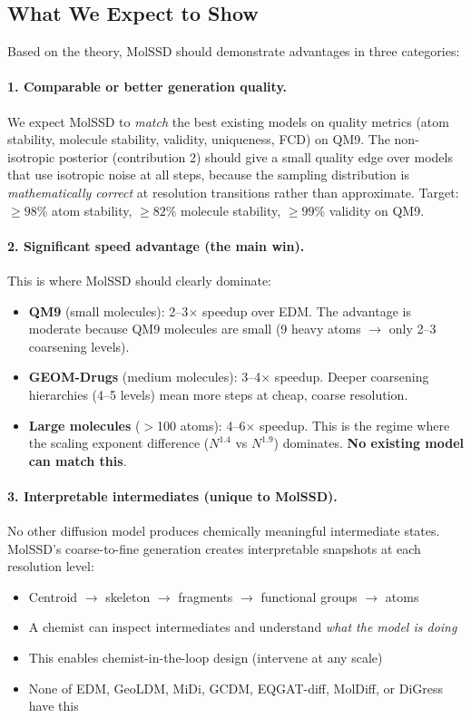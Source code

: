 \documentclass[12pt,a4paper]{article}
\begin{document}
\subsection{What We Expect to Show}

Based on the theory, MolSSD should demonstrate advantages in three categories:

\paragraph{1. Comparable or better generation quality.}
We expect MolSSD to \emph{match} the best existing models on quality metrics (atom stability, molecule stability, validity, uniqueness, FCD) on QM9. The non-isotropic posterior (contribution 2) should give a small quality edge over models that use isotropic noise at all steps, because the sampling distribution is \emph{mathematically correct} at resolution transitions rather than approximate. Target: $\geq 98\%$ atom stability, $\geq 82\%$ molecule stability, $\geq 99\%$ validity on QM9.

\paragraph{2. Significant speed advantage (the main win).}
This is where MolSSD should clearly dominate:
\begin{itemize}
  \item \textbf{QM9} (small molecules): 2--3$\times$ speedup over EDM. The advantage is moderate because QM9 molecules are small (9 heavy atoms $\to$ only 2--3 coarsening levels).
  \item \textbf{GEOM-Drugs} (medium molecules): 3--4$\times$ speedup. Deeper coarsening hierarchies (4--5 levels) mean more steps at cheap, coarse resolution.
  \item \textbf{Large molecules} ($>$100 atoms): 4--6$\times$ speedup. This is the regime where the scaling exponent difference ($N^{1.4}$ vs $N^{1.9}$) dominates. \textbf{No existing model can match this}.
\end{itemize}

\paragraph{3. Interpretable intermediates (unique to MolSSD).}
No other diffusion model produces chemically meaningful intermediate states. MolSSD's coarse-to-fine generation creates interpretable snapshots at each resolution level:
\begin{itemize}
  \item Centroid $\to$ skeleton $\to$ fragments $\to$ functional groups $\to$ atoms
  \item A chemist can inspect intermediates and understand \emph{what the model is doing}
  \item This enables chemist-in-the-loop design (intervene at any scale)
  \item None of EDM, GeoLDM, MiDi, GCDM, EQGAT-diff, MolDiff, or DiGress have this
\end{itemize}
\end{document}
